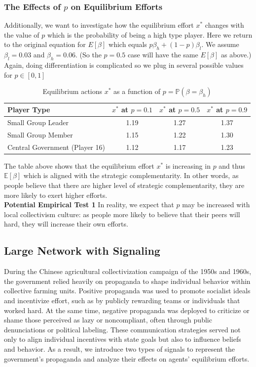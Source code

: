 \documentclass[12pt]{article}
\begin{document}
\subsubsection*{The Effects of $p$ on Equilibrium Efforts}
Additionally, we want to investigate how the equilibrium effort \( x^* \) changes with the value of \( p \) which is the probability of being a high type player. Here we return to the original equation for $E[\beta]$ which equals $p\beta_h+(1-p)\beta_l$. We assume $\beta_l=0.03$ and $\beta_h=0.06$. (So the $p=0.5$ case will have the same $E[\beta]$ as above.)  Again, doing differentiation is complicated so we plug in several possible values for $p \in [0,1]$\\
\begin{table}[H]
  \centering
  \begin{tabular}{lccc}
  \toprule
  \textbf{Player Type} & \textbf{\( x^* \) at \( p = 0.1 \)} & \textbf{\( x^* \) at \( p = 0.5 \)} & \textbf{\( x^* \) at \( p = 0.9 \)} \\
  \midrule
  Small Group Leader        & 1.19 & 1.27 & 1.37 \\
  Small Group Member        & 1.15 & 1.22 & 1.30 \\
  Central Government (Player 16) & 1.12 & 1.17 & 1.23 \\
  \bottomrule
  \end{tabular}
  \caption{Equilibrium actions \( x^* \) as a function of \( p = \mathbb{P}(\beta = \beta_h) \)}
  \label{tab:xstar-vs-p}
  \end{table}
The table above shows that the equilibrium effort \( x^* \) is increasing in \( p \) and thus $\mathbb{E}[\beta]$ which is aligned with the strategic complementarity. In other words, as people believe that there are higher level of strategic complementarity, they are more likely to exert higher efforts.\\ \textbf{Potential Empirical Test 1} In reality, we expect that $p$ may be increased with local collectivism culture: as people more likely to believe that their peers will hard, they will increase their own efforts.\\
\subsection{Large Network with Signaling}
During the Chinese agricultural collectivization campaign of the 1950s and 1960s, the government relied heavily on propaganda to shape individual behavior within collective farming units. Positive propaganda was used to promote socialist ideals and incentivize effort, such as by publicly rewarding teams or individuals that worked hard. At the same time, negative propaganda was deployed to criticize or shame those perceived as lazy or noncompliant, often through public denunciations or political labeling. These communication strategies served not only to align individual incentives with state goals but also to influence beliefs and behavior. As a result, we introduce two types of signals to represent the government's propaganda and analyze their effects on agents' equilibrium efforts.
\end{document}
